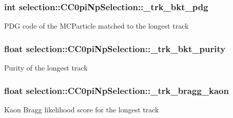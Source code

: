 \subsubsection[{\texorpdfstring{\+\_\+trk\+\_\+bkt\+\_\+pdg}{_trk_bkt_pdg}}]{\setlength{\rightskip}{0pt plus 5cm}int selection\+::\+C\+C0pi\+Np\+Selection\+::\+\_\+trk\+\_\+bkt\+\_\+pdg\hspace{0.3cm}{\ttfamily [private]}}\hypertarget{classselection_1_1CC0piNpSelection_a7044de37ee4f3615ffe4bb15e9f00f8e}{}\label{classselection_1_1CC0piNpSelection_a7044de37ee4f3615ffe4bb15e9f00f8e}
P\+DG code of the M\+C\+Particle matched to the longest track 
\subsubsection[{\texorpdfstring{\+\_\+trk\+\_\+bkt\+\_\+purity}{_trk_bkt_purity}}]{\setlength{\rightskip}{0pt plus 5cm}float selection\+::\+C\+C0pi\+Np\+Selection\+::\+\_\+trk\+\_\+bkt\+\_\+purity\hspace{0.3cm}{\ttfamily [private]}}\hypertarget{classselection_1_1CC0piNpSelection_a39a84b873306f200a2350b4804429791}{}\label{classselection_1_1CC0piNpSelection_a39a84b873306f200a2350b4804429791}
Purity of the longest track 
\subsubsection[{\texorpdfstring{\+\_\+trk\+\_\+bragg\+\_\+kaon}{_trk_bragg_kaon}}]{\setlength{\rightskip}{0pt plus 5cm}float selection\+::\+C\+C0pi\+Np\+Selection\+::\+\_\+trk\+\_\+bragg\+\_\+kaon\hspace{0.3cm}{\ttfamily [private]}}\hypertarget{classselection_1_1CC0piNpSelection_ac9b23583581239191762cfb60307fb78}{}\label{classselection_1_1CC0piNpSelection_ac9b23583581239191762cfb60307fb78}
Kaon Bragg likelihood score for the longest track 

